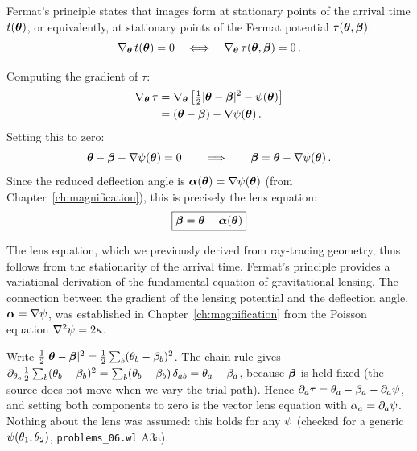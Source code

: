 Fermat's principle states that images form at stationary points
of the arrival time $t(\boldsymbol{\theta})$, or equivalently, at stationary points
of the Fermat potential $\tau(\boldsymbol{\theta}, \boldsymbol{\beta})$:
\begin{equation}
    \nabla_{\boldsymbol{\theta}}\, t(\boldsymbol{\theta}) = 0
    \quad \Longleftrightarrow \quad
    \nabla_{\boldsymbol{\theta}}\, \tau(\boldsymbol{\theta}, \boldsymbol{\beta}) = 0 \,.
    \label{eq:fermat_condition}
\end{equation}

Computing the gradient of $\tau$:
\begin{align}
    \nabla_{\boldsymbol{\theta}}\, \tau &= \nabla_{\boldsymbol{\theta}}\left[
    \tfrac{1}{2}|\boldsymbol{\theta} - \boldsymbol{\beta}|^2 - \psi(\boldsymbol{\theta})\right]
    \nonumber \\
    &= (\boldsymbol{\theta} - \boldsymbol{\beta}) - \nabla\psi(\boldsymbol{\theta}) \,.
    \label{eq:grad_tau}
\end{align}
Setting this to zero:
\begin{equation}
    \boldsymbol{\theta} - \boldsymbol{\beta} - \nabla\psi(\boldsymbol{\theta}) = 0
    \qquad \Longrightarrow \qquad
    \boldsymbol{\beta} = \boldsymbol{\theta} - \nabla\psi(\boldsymbol{\theta}) \,.
    \label{eq:lens_eq_from_fermat}
\end{equation}
Since the reduced deflection angle is $\boldsymbol{\alpha}(\boldsymbol{\theta}) = \nabla\psi(\boldsymbol{\theta})$
(from Chapter~\ref{ch:magnification}), this is precisely
the lens equation:
\begin{equation}
    \boxed{
    \boldsymbol{\beta} = \boldsymbol{\theta} - \boldsymbol{\alpha}(\boldsymbol{\theta})
    }
    \label{eq:lens_eq_fermat}
\end{equation}

\begin{remark}
The lens equation, which we previously derived
from ray-tracing geometry, thus follows from the
stationarity of the arrival time.  Fermat's principle provides
a variational derivation of the fundamental equation of gravitational
lensing.  The connection between the gradient of the lensing potential and
the deflection angle, $\boldsymbol{\alpha} = \nabla\psi$, was established in
Chapter~\ref{ch:magnification} from the Poisson equation
$\nabla^2\psi = 2\kappa$.
\end{remark}

\begin{derivation}[$\nabla\tau = 0$ in components]
Write $\tfrac{1}{2}|\boldsymbol{\theta}-\boldsymbol{\beta}|^2 = \tfrac{1}{2}\sum_b(\theta_b-\beta_b)^2$.  The
chain rule gives
$\partial_{\theta_a}\tfrac{1}{2}\sum_b(\theta_b-\beta_b)^2 = \sum_b(\theta_b-\beta_b)\,\delta_{ab}
= \theta_a-\beta_a$, because $\boldsymbol{\beta}$ is held fixed (the source does not
move when we vary the trial path).  Hence
$\partial_a\tau = \theta_a-\beta_a-\partial_a\psi$, and setting both
components to zero is the vector lens equation with
$\alpha_a = \partial_a\psi$.  Nothing about the lens was assumed: this holds
for any $\psi$ (checked for a generic $\psi(\theta_1,\theta_2)$,
\texttt{problems\_06.wl} A3a).
\end{derivation}

